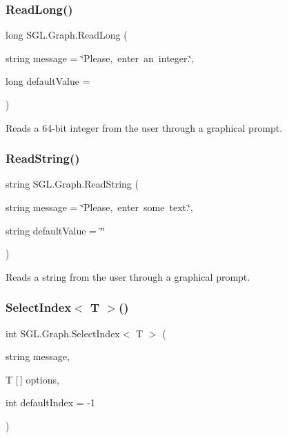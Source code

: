 \subsubsection{\texorpdfstring{Read\+Long()}{ReadLong()}}
{\footnotesize\ttfamily long S\+G\+L.\+Graph.\+Read\+Long (\begin{DoxyParamCaption}\item[{string}]{message = {\ttfamily \char`\"{}Please,~enter~an~integer.\char`\"{}},  }\item[{long}]{default\+Value = {} }\end{DoxyParamCaption})\hspace{0.3cm}{\ttfamily [inline]}}



Reads a 64-\/bit integer from the user through a graphical prompt. 

\mbox{\label{class_s_g_l_1_1_graph_a25db2a007fb5adaa390a44f16d4d653e}} 
\subsubsection{\texorpdfstring{Read\+String()}{ReadString()}}
{\footnotesize\ttfamily string S\+G\+L.\+Graph.\+Read\+String (\begin{DoxyParamCaption}\item[{string}]{message = {\ttfamily \char`\"{}Please,~enter~some~text.\char`\"{}},  }\item[{string}]{default\+Value = {\ttfamily \char`\"{}\char`\"{}} }\end{DoxyParamCaption})\hspace{0.3cm}{\ttfamily [inline]}}



Reads a string from the user through a graphical prompt. 

\mbox{\label{class_s_g_l_1_1_graph_ab1d2be74da25ee0a40829993a2f597c4}} 
\subsubsection{\texorpdfstring{Select\+Index$<$ T $>$()}{SelectIndex< T >()}}
{\footnotesize\ttfamily int S\+G\+L.\+Graph.\+Select\+Index$<$ T $>$ (\begin{DoxyParamCaption}\item[{string}]{message,  }\item[{T \mbox{[}$\,$\mbox{]}}]{options,  }\item[{int}]{default\+Index = {\ttfamily -\/1} }\end{DoxyParamCaption})\hspace{0.3cm}{\ttfamily [inline]}}



